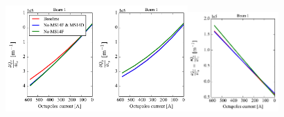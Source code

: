 \documentclass{cernatsnote}
\begin{document}
\begin{figure}[h!]
\centering
\includegraphics[width=0.31\textwidth]{images/qxjx_all_b1_ca.pdf}\hfill \includegraphics[width=0.31\textwidth]{images/qyjy_all_b1_ca.pdf}\hfill \includegraphics[width=0.31\textwidth]{images/qxjy_all_b1_ca.pdf} \\

\end{figure}
\end{document}
